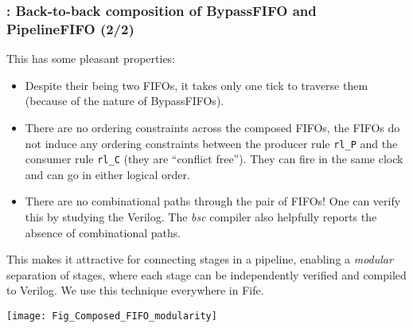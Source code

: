 \begin{frame}[fragile]
\frametitle{{\BSV}: Back-to-back composition of BypassFIFO and PipelineFIFO (2/2)}

\label{Slide_FIFO_Composition}

\footnotesize

This has some pleasant properties:

\vspace{1ex}

\begin{itemize}

 \item Despite their being two FIFOs, it takes only one tick to
        traverse them (because of the nature of BypassFIFOs).

 \PAUSE{\vspace{1ex}}

 \item There are no ordering constraints across the composed FIFOs,
       {\ie} the FIFOs do not induce any ordering constraints between
       the producer rule \verb|rl_P| and the consumer rule \verb|rl_C|
       (they are ``conflict free'').  They can fire in the same clock
       and can go in either logical order.

 \PAUSE{\vspace{1ex}}

 \item There are no combinational paths through the pair of FIFOs!
       One can verify this by studying the Verilog.  The \emph{bsc}
       compiler also helpfully reports the absence of combinational
       paths.

\end{itemize}

\PAUSE{\vspace{5ex}}

\begin{minipage}{0.37\textwidth}
This makes it attractive for connecting stages in a pipeline, enabling
a \emph{modular} separation of stages, where each stage can be
independently verified and compiled to Verilog. We use this technique
everywhere in Fife.
\end{minipage}
\hfill
\begin{minipage}{0.6\textwidth}
  \texttt{[image: Fig\_Composed\_FIFO\_modularity]}
\end{minipage}

\end{frame}


